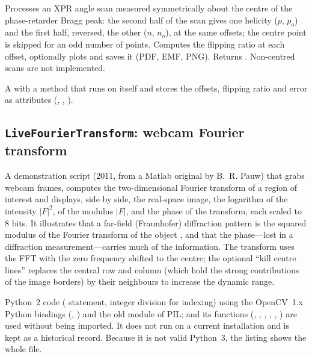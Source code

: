 Processes an XPR angle scan measured symmetrically about the centre of the phase-retarder
Bragg peak: the second half of the scan gives one helicity ($p$, $p_o$) and the first half,
reversed, the other ($n$, $n_o$), at the same offsets; the centre point is skipped for an odd
number of points. Computes the flipping ratio at each offset, optionally plots and saves it
(PDF, EMF, PNG). Returns . Non-centred scans are not implemented.

A  with a method that runs  on itself and stores the
offsets, flipping ratio and error as attributes (, ,
).

\subsection{\texttt{LiveFourierTransform}: webcam Fourier transform}

A demonstration script (2011, from a Matlab original by B.~R. Pauw) that grabs webcam frames,
computes the two-dimensional Fourier transform of a region of interest and displays, side by
side, the real-space image, the logarithm of the intensity $|F|^2$, of the modulus $|F|$, and
the phase of the transform, each scaled to 8 bits. It illustrates that a far-field
(Fraunhofer) diffraction pattern is the squared modulus of the Fourier transform of the object
\citep{Goodman2005}, and that the phase---lost in a diffraction measurement---carries much of
the information. The transform uses the FFT \citep{Cooley1965} with the zero frequency shifted
to the centre; the optional ``kill centre lines'' replaces the central row and column (which
hold the strong contributions of the image borders) by their neighbours to increase the
dynamic range.

\begin{issue}
Python~2 code ( statement, integer division  for indexing) using the
OpenCV~1.x Python bindings (, ) and the old  module of PIL;
 and its functions (, , , , ,
) are used without being imported. It does not run on a current installation and
is kept as a historical record. Because it is not valid Python~3, the listing shows the whole
file.
\end{issue}

